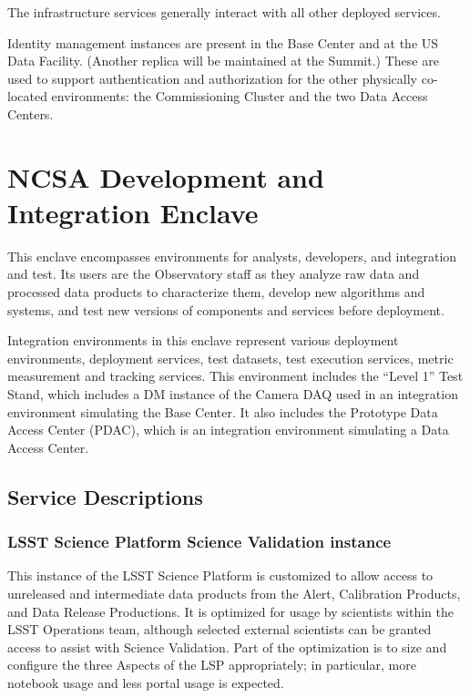 \documentclass[DM,toc,lsstdraft]{lsstdoc}
\begin{document}
The infrastructure services generally interact with all other deployed
services.

Identity management instances are present in the Base Center and at the US Data Facility.
(Another replica will be maintained at the Summit.)  These are used to support
authentication and authorization for the other physically co-located environments:
the Commissioning Cluster and the two Data Access Centers.


\section{NCSA Development and Integration Enclave}\label{ncsa-development-integration-enclave}

This enclave encompasses environments for analysts, developers, and
integration and test. Its users are the Observatory staff as they
analyze raw data and processed data products to characterize them,
develop new algorithms and systems, and test new versions of components
and services before deployment.

Integration environments in this enclave represent various deployment environments, deployment services, test datasets, test execution services, metric measurement and tracking services.
This environment includes the ``Level 1'' Test Stand, which includes a DM instance of the Camera DAQ used in an integration environment simulating the Base Center.
It also includes the Prototype Data Access Center (PDAC), which is an integration environment simulating a Data Access Center.

\subsection{Service Descriptions}\label{ncsa-dev-int-service-descriptions}

\subsubsection{LSST Science Platform Science Validation
instance}\label{lsst-science-platform-science-validation-instance}

This instance of the LSST Science Platform is customized to allow access
to unreleased and intermediate data products from the Alert, Calibration
Products, and Data Release Productions. It is optimized for usage by
scientists within the LSST Operations team, although selected external
scientists can be granted access to assist with Science Validation. Part
of the optimization is to size and configure the three Aspects of the
LSP appropriately; in particular, more notebook usage and less portal
usage is expected.
\end{document}

